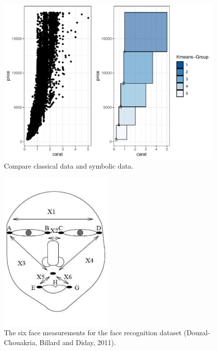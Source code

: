 \documentclass[article]{jss}
\begin{document}
\begin{appendix}
\begin{figure}[t!]
\centering
\includegraphics[width=1\textwidth]{pic/compare} 
\caption{\label{fig:compare} Compare classical data and symbolic data.}
\end{figure}



\begin{figure}[t!]
\centering
\includegraphics[width=0.5\textwidth]{pic/face}
\caption{\label{fig:face} The six face measurements for the face recognition dataset 
(Douzal-Chouakria, Billard and Diday, 2011).}
\end{figure}




\end{appendix}
\end{document}
